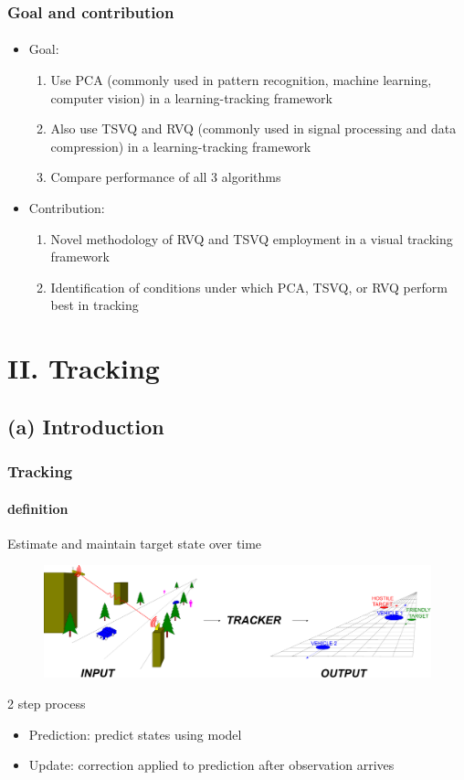 \begin{frame}
\frametitle{Goal and contribution}
\framesubtitle{}
\mypagenum
\begin{itemize}
\item Goal: 
\begin{enumerate}
\item Use PCA (commonly used in pattern recognition, machine learning, computer vision) in a learning-tracking framework
\item Also use TSVQ and RVQ (commonly used in signal processing and data compression) in a learning-tracking framework 
\item Compare performance of all 3 algorithms
\end{enumerate}
\vspace{0.2in}
\item Contribution:
\begin{enumerate}
\item Novel methodology of RVQ and TSVQ employment in a visual tracking framework
\item Identification of conditions under which PCA, TSVQ, or RVQ perform best in tracking
\end{enumerate}
\end{itemize}
\end{frame}




\section{II. Tracking}
\subsection{(a) Introduction}
\begin{frame}
\frametitle{Tracking}
\framesubtitle{definition}
\mypagenum
	Estimate and maintain {\color{red}target state} over {\color{red}time}
	\begin{figure}
		\includegraphics[width=1.0\textwidth]{thesis/TRK_overviewDiagram.pdf}
	\end{figure}
	\vspace{0.2in}
	2 step process
	\begin{itemize}
	\item Prediction: predict states using model
	\item Update: correction applied to prediction after observation arrives
	\end{itemize}
\end{frame}



